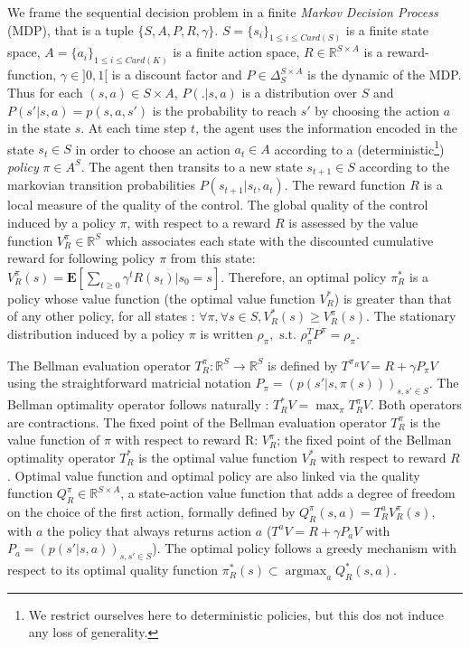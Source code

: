 \documentclass[11pt]{article}
\newcommand{\E}{\mathbf{E}}
\newcommand{\argmax}{\operatorname*{argmax}} %
\begin{document}
We frame the sequential decision problem in a finite \emph{Markov Decision Process} (MDP), that is a tuple $\{S,A,P,R,\gamma\}$. $S=\{s_i\}_{1\leq i\leq Card(S)}$ is a finite state space, $A=\{a_i\}_{1\leq i\leq Card(K)}$ is a finite action space, $R\in\mathbb{R}^{S\times A}$ is a reward-function, $\gamma\in ]0,1[$ is a discount factor and $P\in \Delta_{S}^{S\times A}$ is the dynamic of the MDP. Thus for each $(s,a)\in S\times A$, $P(.|s,a)$ is a distribution over $S$ and $P(s'|s,a)=p(s,a,s')$ is the probability to reach $s'$ by choosing the action $a$ in the state $s$. At each time step $t$, the agent uses the information encoded in the state $s_t\in S$ in order to choose an action $a_t \in A$ according to a (deterministic\footnote{We restrict ourselves here to deterministic policies, but this dos not induce any loss of generality.}) \emph{policy} $\pi\in A^S$. The agent then transits to a new state $s_{t+1}\in S$ according to the markovian transition probabilities $P(s_{t+1}|s_t,a_t)$. The reward function $R$ is a local measure of the quality of the control. The global quality of the control induced by a policy $\pi$, with respect to a reward $R$ is assessed by the value function $V^\pi_R \in \mathbb{R}^{S}$ which associates each state with the discounted cumulative reward for following policy $\pi$ from this state: $V^\pi_R(s) = \E[\sum_{t\geq 0}\gamma^tR(s_t)|s_0 = s]$. Therefore, an optimal policy $\pi^*_R$ is a policy whose value function (the optimal value function $V^*_R$) is greater than that of any other policy, for all states : $\forall \pi, \forall s \in S, V^*_R(s) \geq V^\pi_R(s)$. The stationary distribution induced by a policy $\pi$ is written $\rho_\pi,\textrm{ s.t. }\rho_\pi^TP^\pi = \rho_\pi$.

The Bellman evaluation operator $T^\pi_R: \mathbb{R}^{S} \rightarrow  \mathbb{R}^{S}$ is defined by $T^{\pi_R}V = R + \gamma P_\pi V$ using the straightforward matricial notation $P_\pi = (p(s'|s,\pi(s)))_{s,s' \in S}$. The Bellman optimality operator follows naturally : $T^*_RV = \max_\pi T^\pi_RV$. Both operators are contractions. The fixed point of the Bellman evaluation operator $T^\pi_R$ is the value function of $\pi$ with respect to reward R: $V^\pi_R$; the fixed point of the Bellman optimality operator $T^*_R$ is the optimal value function $V_R^*$ with respect to reward $R$. Optimal value function and optimal policy are also linked via the quality function $Q^\pi_R\in\mathbb{R}^{S\times A}$, a state-action value function that adds a degree of freedom on the choice of the first action, formally defined by $Q^\pi_R(s,a) = T^a_RV^\pi_R(s)$, with $a$ the policy that always returns action $a$ ($T^aV = R + \gamma P_a V$ with $P_a = (p(s'|s,a))_{s,s' \in S}$). The optimal policy follows a greedy mechanism with respect to its optimal quality function $\pi^*_R(s)\subset\argmax_aQ^*_R(s,a)$.
\end{document}
